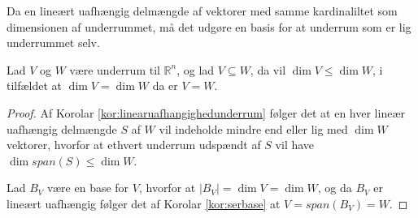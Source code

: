 Da en lineært uafhængig delmængde af vektorer med samme kardinaliltet som dimensionen af underrummet, må det udgøre en basis for at underrum som er lig underrummet selv.
\begin{stn}
Lad $V$ og $W$ være underrum til $\mathds{R}^n$, og lad $V \subseteq W$, da vil $\dim{V} \leq \dim{W}$, i tilfældet at $\dim{V}=\dim{W}$ da er $V=W$.
\label{stn:dimunderrum}
\end{stn}
\begin{proof}
Af Korolar \ref{kor:linearuafhangighedunderrum} følger det at en hver lineær uafhængig delmængde $S$ af $W$ vil indeholde mindre end eller lig med $\dim{W}$ vektorer, hvorfor at ethvert underrum udspændt af $S$ vil have $\dim{span(S)} \leq \dim{W}$.

Lad $B_V$ være en base for $V$, hvorfor at $|B_V| = \dim{V} = \dim{W}$, og da $B_V$ er lineært uafhængig følger det af Korolar \ref{kor:serbase} at $V = span(B_V) = W$.
\end{proof}